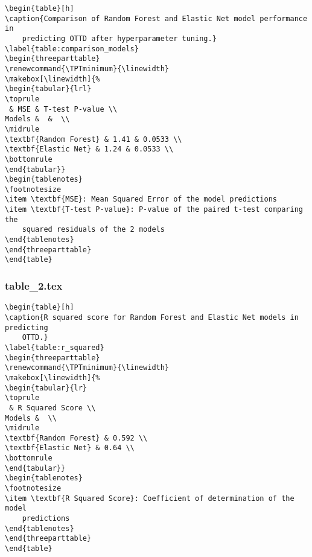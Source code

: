 \documentclass[11pt]{article}
\begin{document}
\begin{Verbatim}[tabsize=4]
\begin{table}[h]
\caption{Comparison of Random Forest and Elastic Net model performance in
	predicting OTTD after hyperparameter tuning.}
\label{table:comparison_models}
\begin{threeparttable}
\renewcommand{\TPTminimum}{\linewidth}
\makebox[\linewidth]{%
\begin{tabular}{lrl}
\toprule
 & MSE & T-test P-value \\
Models &  &  \\
\midrule
\textbf{Random Forest} & 1.41 & 0.0533 \\
\textbf{Elastic Net} & 1.24 & 0.0533 \\
\bottomrule
\end{tabular}}
\begin{tablenotes}
\footnotesize
\item \textbf{MSE}: Mean Squared Error of the model predictions
\item \textbf{T-test P-value}: P-value of the paired t-test comparing the
	squared residuals of the 2 models
\end{tablenotes}
\end{threeparttable}
\end{table}

\end{Verbatim}

\subsubsection*{table\_2.tex}

\begin{Verbatim}[tabsize=4]
\begin{table}[h]
\caption{R squared score for Random Forest and Elastic Net models in predicting
	OTTD.}
\label{table:r_squared}
\begin{threeparttable}
\renewcommand{\TPTminimum}{\linewidth}
\makebox[\linewidth]{%
\begin{tabular}{lr}
\toprule
 & R Squared Score \\
Models &  \\
\midrule
\textbf{Random Forest} & 0.592 \\
\textbf{Elastic Net} & 0.64 \\
\bottomrule
\end{tabular}}
\begin{tablenotes}
\footnotesize
\item \textbf{R Squared Score}: Coefficient of determination of the model
	predictions
\end{tablenotes}
\end{threeparttable}
\end{table}

\end{Verbatim}
\end{document}
